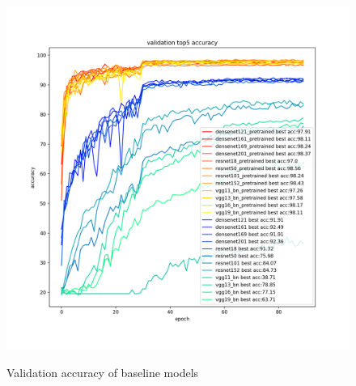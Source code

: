 \begin{figure}[ht]
\begin{minipage}[t]{0.5\linewidth}
    \includegraphics[width=1.1\textwidth]{figs/val_acc5.png}
    \label{fig:val_acc5}
  \end{minipage}
  \caption{Validation accuracy of baseline models}
\end{figure}



